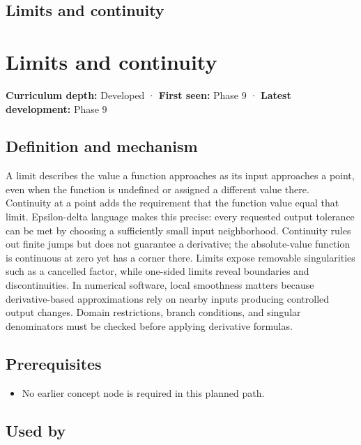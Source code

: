 \hypertarget{appendix-fecc1847f5a3}{}
\section*{Limits and continuity}
\chapter{Limits and continuity}\label{appendix-fecc1847f5a3-limits-and-continuity}

\textbf{Curriculum depth:} Developed · \textbf{First seen:} Phase 9 · \textbf{Latest development:} Phase 9

\section{Definition and mechanism}\label{appendix-fecc1847f5a3-definition-and-mechanism}

A limit describes the value a function approaches as its input approaches a point, even when the function is undefined or assigned a different value there. Continuity at a point adds the requirement that the function value equal that limit. Epsilon-delta language makes this precise: every requested output tolerance can be met by choosing a sufficiently small input neighborhood. Continuity rules out finite jumps but does not guarantee a derivative; the absolute-value function is continuous at zero yet has a corner there. Limits expose removable singularities such as a cancelled factor, while one-sided limits reveal boundaries and discontinuities. In numerical software, local smoothness matters because derivative-based approximations rely on nearby inputs producing controlled output changes. Domain restrictions, branch conditions, and singular denominators must be checked before applying derivative formulas.

\section{Prerequisites}\label{appendix-fecc1847f5a3-prerequisites}

\begin{itemize}
\tightlist
\item
  No earlier concept node is required in this planned path.
\end{itemize}

\section{Used by}\label{appendix-fecc1847f5a3-used-by}

